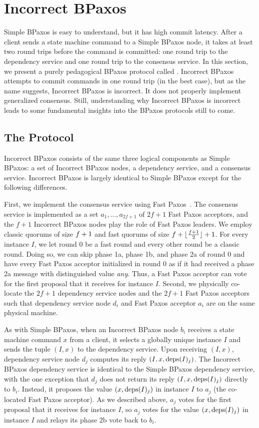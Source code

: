 \section{Incorrect BPaxos}
Simple BPaxos is easy to understand, but it has high commit latency. After a
client sends a state machine command to a Simple BPaxos node, it takes at least
two round trips before the command is committed: one round trip to the
dependency service and one round trip to the consensus service. In this
section, we present a purely pedagogical BPaxos protocol called
. Incorrect BPaxos attempts to commit commands in
one round trip (in the best case), but as the name suggests, Incorrect BPaxos
is incorrect. It does not properly implement generalized consensus. Still,
understanding why Incorrect BPaxos is incorrect leads to some fundamental
insights into the BPaxos protocols still to come.

\subsection{The Protocol}
Incorrect BPaxos consists of the same three logical components as Simple
BPaxos: a set of Incorrect BPaxos nodes, a dependency service, and a consensus
service. Incorrect BPaxos is largely identical to Simple BPaxos except for the
following differences.

First, we implement the consensus service using Fast
Paxos~\cite{lamport2006fast}. The consensus service is implemented as a set
$a_1, \ldots, a_{2f + 1}$ of $2f + 1$ Fast Paxos acceptors, and the $f + 1$
Incorrect BPaxos nodes play the role of Fast Paxos leaders. We employ classic
quorums of size $f + 1$ and fast quorums of size $f + \lfloor\frac{f + 1}{2}\rfloor + 1$. For
every instance $I$, we let round $0$ be a fast round and every other round be a
classic round. Doing so, we can skip phase 1a, phase 1b, and phase 2a of round
$0$ and have every Fast Paxos acceptor initialized in round $0$ as if it had
received a phase 2a message with distinguished value \emph{any}. Thus, a Fast
Paxos acceptor can vote for the first proposal that it receives for instance
$I$.
%
Second, we physically co-locate the $2f + 1$ dependency service nodes and the
$2f + 1$ Fast Paxos acceptors such that dependency service node $d_i$ and Fast
Paxos acceptor $a_i$ are on the same physical machine.

As with Simple BPaxos, when an Incorrect BPaxos node $b_i$ receives a state
machine command $x$ from a client, it selects a globally unique instance $I$
and sends the tuple $(I, x)$ to the dependency service. Upon receiving $(I,
x)$, dependency service node $d_j$ computes its reply $(I, x, \text{deps}(I)_j)$.
The Incorrect BPaxos dependency service is identical to the Simple BPaxos
dependency service, with the one exception that $d_j$ does not return its reply
$(I, x, \text{deps}(I)_j)$ directly to $b_i$. Instead, it proposes the value $(x,
\text{deps}(I)_j)$ in instance $I$ to $a_j$ (the co-located Fast Paxos acceptor). As
we described above, $a_j$ votes for the first proposal that it receives for
instance $I$, so $a_j$ votes for the value $(x, \text{deps}(I)_j)$ in instance $I$
and relays its phase 2b vote back to $b_i$.


